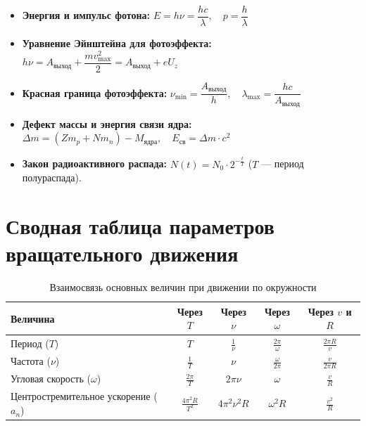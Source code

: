 \documentclass[11pt, a4paper]{article}
\begin{document}
\begin{itemize}
    \item \textbf{Энергия и импульс фотона:} $E = h \nu = \dfrac{h c}{\lambda}, \quad p = \dfrac{h}{\lambda}$
    \item \textbf{Уравнение Эйнштейна для фотоэффекта:} $h \nu = A_{\text{выход}} + \dfrac{m v_{\max}^2}{2} = A_{\text{выход}} + e U_z$
    \item \textbf{Красная граница фотоэффекта:} $\nu_{\min} = \dfrac{A_{\text{выход}}}{h}, \quad \lambda_{\max} = \dfrac{h c}{A_{\text{выход}}}$
    \item \textbf{Дефект массы и энергия связи ядра:} $\Delta m = (Z m_p + N m_n) - M_{\text{ядра}}, \quad E_{\text{св}} = \Delta m \cdot c^2$
    \item \textbf{Закон радиоактивного распада:} $N(t) = N_0 \cdot 2^{-\frac{t}{T}}$ \quad ($T$ --- период полураспада).
\end{itemize}

\newpage
\section{Сводная таблица параметров вращательного движения}

\begin{table}[h!]
\centering
\caption{Взаимосвязь основных величин при движении по окружности}
\vspace{2mm}
\begin{tabular}{lcccc}
\toprule
\textbf{Величина} & \textbf{Через $T$} & \textbf{Через $\nu$} & \textbf{Через $\omega$} & \textbf{Через $v$ и $R$} \\
\midrule
Период ($T$) & $T$ & $\frac{1}{\nu}$ & $\frac{2\pi}{\omega}$ & $\frac{2\pi R}{v}$ \\
Частота ($\nu$) & $\frac{1}{T}$ & $\nu$ & $\frac{\omega}{2\pi}$ & $\frac{v}{2\pi R}$ \\
Угловая скорость ($\omega$) & $\frac{2\pi}{T}$ & $2\pi\nu$ & $\omega$ & $\frac{v}{R}$ \\
Центростремительное ускорение ($a_n$) & $\frac{4\pi^2 R}{T^2}$ & $4\pi^2\nu^2 R$ & $\omega^2 R$ & $\frac{v^2}{R}$ \\
\bottomrule
\end{tabular}
\end{table}
\end{document}
